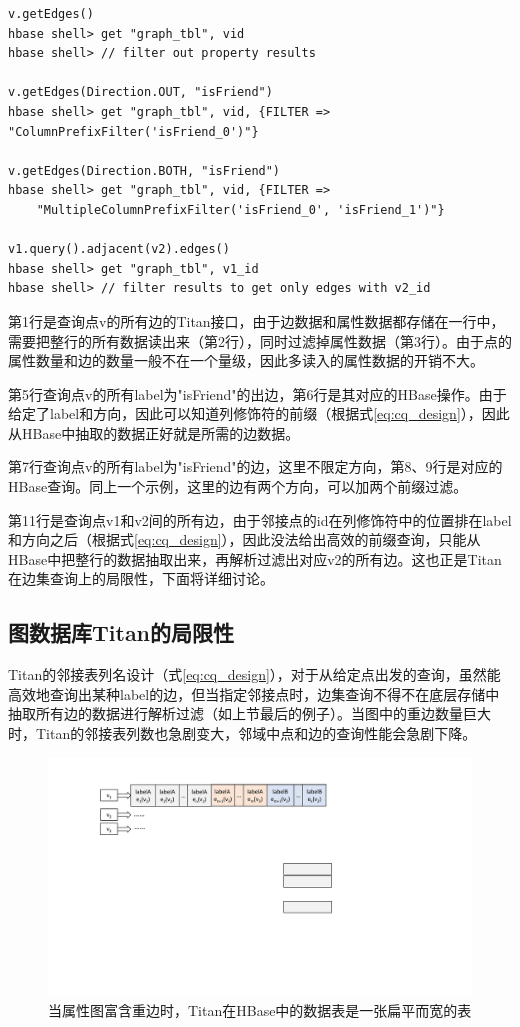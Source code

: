 \begin{lstlisting}
v.getEdges()
hbase shell> get "graph_tbl", vid
hbase shell> // filter out property results

v.getEdges(Direction.OUT, "isFriend")
hbase shell> get "graph_tbl", vid, {FILTER => "ColumnPrefixFilter('isFriend_0')"}

v.getEdges(Direction.BOTH, "isFriend")
hbase shell> get "graph_tbl", vid, {FILTER => 
    "MultipleColumnPrefixFilter('isFriend_0', 'isFriend_1')"}

v1.query().adjacent(v2).edges()
hbase shell> get "graph_tbl", v1_id
hbase shell> // filter results to get only edges with v2_id
\end{lstlisting}

第1行是查询点v的所有边的Titan接口，由于边数据和属性数据都存储在一行中，需要把整行的所有数据读出来（第2行），同时过滤掉属性数据（第3行）。由于点的属性数量和边的数量一般不在一个量级，因此多读入的属性数据的开销不大。

第5行查询点v的所有label为"isFriend"的出边，第6行是其对应的HBase操作。由于给定了label和方向，因此可以知道列修饰符的前缀（根据式\ref{eq:cq_design}），因此从HBase中抽取的数据正好就是所需的边数据。

第7行查询点v的所有label为"isFriend"的边，这里不限定方向，第8、9行是对应的HBase查询。同上一个示例，这里的边有两个方向，可以加两个前缀过滤。

第11行是查询点v1和v2间的所有边，由于邻接点的id在列修饰符中的位置排在label和方向之后（根据式\ref{eq:cq_design}），因此没法给出高效的前缀查询，只能从HBase中把整行的数据抽取出来，再解析过滤出对应v2的所有边。这也正是Titan在边集查询上的局限性，下面将详细讨论。

\subsection{图数据库Titan的局限性}
Titan的邻接表列名设计（式\ref{eq:cq_design}），对于从给定点出发的查询，虽然能高效地查询出某种label的边，但当指定邻接点时，边集查询不得不在底层存储中抽取所有边的数据进行解析过滤（如上节最后的例子）。当图中的重边数量巨大时，Titan的邻接表列数也急剧变大，邻域中点和边的查询性能会急剧下降。

\begin{figure}[htbp]
\centering
\includegraphics[width=150mm]{fig/original_list.pdf}
\caption[存储大量重边时的邻接表]{当属性图富含重边时，Titan在HBase中的数据表是一张扁平而宽的表}
\label{fig:orginal_list}
\end{figure}

